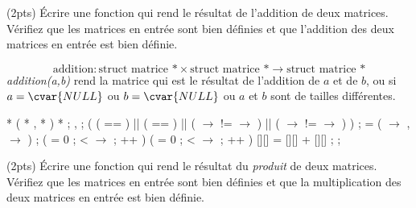 \question (2pts) {\'E}crire une fonction qui rend le r{\'e}sultat de
l'addition de deux matrices. V{\'e}rifiez que les matrices en entr{\'e}e 
sont bien d{\'e}finies et que l'addition des deux matrices en entr{\'e}e est
bien d{\'e}finie.

\begin{solution}
  $$
  \mbox{addition}:  \mbox{struct matrice *} \times \mbox{struct matrice *}  \to \mbox{struct matrice *}
  $$
  \emph{addition(a,b)} rend la matrice qui est le r{\'e}sultat de
  l'addition de $a$ et de $b$, ou  si $a=\cvar{NULL}$ ou
  $b=\cvar{NULL}$ ou $a$ et $b$ sont de tailles diff{\'e}rentes.
  \begin{Ccode}
\ctab{}\cstruct {} *
\ctab{} ( \cstruct {} *  , \cstruct {} *  )
\ctab{}\lb
\ctab{}  \cstruct {} *  ;
\ctab{}  \cint {} ,  ;
\ctab{}
\ctab{}  \cif ( (  ==  ) || (  ==  ) || 
\ctab{}       ( \ensuremath{\rightarrow} !=  \ensuremath{\rightarrow}  ) || 
\ctab{}       ( \ensuremath{\rightarrow} !=  \ensuremath{\rightarrow}  ) )
\ctab{}    \creturn {} ;
\ctab{}
\ctab{}   =  ( \ensuremath{\rightarrow} , \ensuremath{\rightarrow} ) ;
\ctab{}
\ctab{}  \cfor (  = 0 ;  < \ensuremath{\rightarrow} ; ++ )
\ctab{}    \lb
\ctab{}      \cfor ( = 0 ;  < \ensuremath{\rightarrow} ; ++ )
\ctab{}	\lb
\ctab{}	  [][] = [][] + [][] ;
\ctab{}	\rb
\ctab{}    \rb
\ctab{}
\ctab{}  \creturn {} ;
\ctab{}\rb
  \end{Ccode}
\end{solution}


\question (2pts) {\'E}crire une fonction qui rend le r{\'e}sultat du
\emph{produit} de deux matrices. V{\'e}rifiez que les matrices en entr{\'e}e
sont bien d{\'e}finies et que la multiplication des deux matrices en
entr{\'e}e est bien d{\'e}finie.

